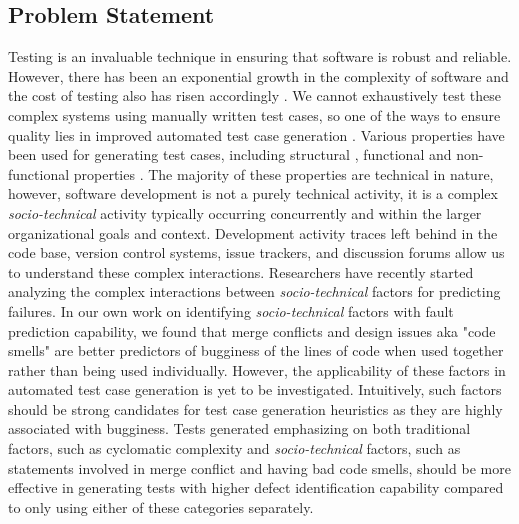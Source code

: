 \documentclass[10pt]{article}
\begin{document}
\subsection{Problem Statement}
Testing is an invaluable technique in ensuring that software is robust and reliable. However, there has been an exponential growth in the complexity of software and the cost of testing also has risen accordingly \cite{myers2011art}. We cannot exhaustively test these complex systems using manually written test cases, so one of the ways to ensure quality lies in improved automated test case generation \cite{anand2013orchestrated,harman2012search}. Various properties have been used for generating test cases, including
structural \cite{tonella2004evolutionary}, functional \cite{wegener2004evaluation} and non-functional properties \cite{wegener1998verifying}. The majority of these properties are technical in nature, however, software development is not a purely technical activity, it is a complex \emph{socio-technical} activity typically occurring concurrently and within the larger organizational goals and context. Development activity traces left behind in the code base, version control systems, issue trackers, and discussion forums allow us to understand these complex interactions. Researchers have recently started analyzing the complex interactions between \emph{socio-technical} factors for predicting failures. In our own work on identifying \emph{socio-technical} factors with fault prediction capability, we found that merge conflicts and design issues aka "code smells" are better predictors of bugginess of the lines of code \cite{ahmedempirical} when used together rather than being used individually. However, the applicability of these factors in automated test case generation is yet to be investigated. Intuitively, such factors should be strong candidates for test case generation heuristics as they are highly associated with bugginess. Tests generated emphasizing on both traditional factors, such as cyclomatic complexity and \emph{socio-technical} factors, such as statements involved in merge conflict and having bad code smells, should be more effective in generating tests with higher defect identification capability compared to only using either of these categories separately.

\end{document}

